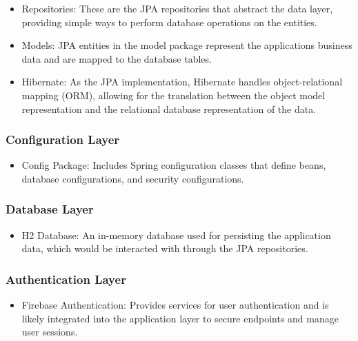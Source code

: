 \begin{itemize}

\item Repositories: These are the JPA repositories that abstract the data layer, providing simple ways to perform database operations on the entities.

\item Models: JPA entities in the model package represent the applications business data and are mapped to the database tables.

\item Hibernate: As the JPA implementation, Hibernate handles object-relational mapping (ORM), allowing for the translation between the object model representation and the relational database representation of the data. \cite{harvardEA2023}

\end{itemize}

\subsubsection{Configuration Layer}

\begin{itemize}

\item Config Package: Includes Spring configuration classes that define beans, database configurations, and security configurations. 

\end{itemize}

\subsubsection{Database Layer}

\begin{itemize}

\item H2 Database: An in-memory database used for persisting the application data, which would be interacted with through the JPA repositories.

\end{itemize}

\subsubsection{Authentication Layer}

\begin{itemize}
    
\item Firebase Authentication: Provides services for user authentication and is likely integrated into the application layer to secure endpoints and manage user sessions.

\end{itemize}

